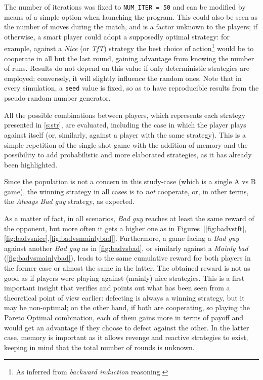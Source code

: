 \documentclass[journal,10pt,twoside]{IEEEtran}
\begin{document}
The number of iterations was fixed to \texttt{NUM\_ITER = 50} and can be modified by means of a simple option when launching the program.
This could also be seen as the number of moves during the match, and is a factor unknown to the players; if otherwise, a smart player could adopt a supposedly optimal strategy: for example, against a \textit{Nice} (or \textit{TfT}) strategy the best choice of action\footnote{As inferred from \textit{backward induction} reasoning.} would be to cooperate in all but the last round, gaining advantage from knowing the number of runs.
Results do not depend on this value if only deterministic strategies are employed; conversely, it will slightly influence the random ones.
Note that in every simulation, a \texttt{seed} value is fixed, so as to have reproducible results from the pseudo-random number generator.

All the possible combinations between players, which represents each strategy presented in \autoref{s:str}, are evaluated, including the case in which the player plays against itself (or, similarly, against a player with the same strategy).
This is a simple repetition of the single-shot game with the addition of memory and the possibility to add probabilistic and more elaborated strategies, as it has already been highlighted.

Since the population is not a concern in this study-case (which is a single A vs B game), the winning strategy in all cases is to \textit{not} cooperate, or, in other terms, the \textit{Always Bad guy} strategy, as expected.

As a matter of fact, in all scenarios, \textit{Bad guy} reaches at least the same reward of the opponent, but more often it gets a higher one as in Figures~[\ref{fig:badvstft},\ref{fig:badvsnice},\ref{fig:badvsmainlybad}]. 
Furthermore, a game facing a \textit{Bad guy} against another \textit{Bad guy} as in \autoref{fig:badvsbad}, or similarly against a \textit{Mainly bad} (\autoref{fig:badvsmainlybad}), leads to the same cumulative reward for both players in the former case or almost the same in the latter. The obtained reward is not as good as if players were playing against (mainly) nice strategies.
This is a first important insight that verifies and points out what has been seen from a theoretical point of view earlier: defecting is always a winning strategy, but it may be non-optimal; on the other hand, if both are cooperating, so playing the Pareto Optimal combination, each of them gains more in terms of payoff and would get an advantage if they choose to defect against the other. In the latter case, memory is important as it allows revenge and reactive strategies to exist, keeping in mind that the total number of rounds is unknown. 
\end{document}
